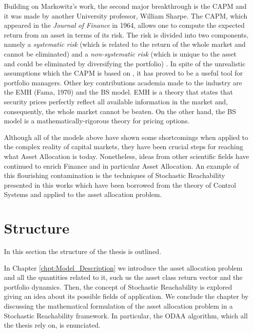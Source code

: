 Building on Markowitz's work, the second major breakthrough is the \gls{CAPM} and it was made by another University professor, William Sharpe. The \gls{CAPM}, which appeared in the \textit{Journal of Finance} in 1964, allows one to compute the expected return from an asset in terms of its risk. The risk is divided into two components, namely a \textit{systematic risk} (which is related to the return of the whole market and cannot be eliminated) and a \textit{non-systematic risk} (which is unique to the asset and could be eliminated by diversifying the portfolio) \cite{hull2014}. In spite of the unrealistic assumptions which the \gls{CAPM} is based on \cite{hull2015risk},  it has proved to be a useful tool for portfolio managers. Other key contributions academia made to the industry are the \gls{EMH} (Fama, 1970) and the \gls{BS} model. \gls{EMH} is a theory that states that security prices perfectly reflect all available information in the market and, consequently, the whole market cannot be beaten. On the other hand, the \gls{BS} model is a mathematically-rigorous theory for pricing options.

Although all of the models above have shown some shortcomings when applied to the complex reality of capital markets, they have been crucial steps for reaching what Asset Allocation is today. Nonetheless, ideas from other scientific fields have continued to  enrich Finance and in particular Asset Allocation. An example of this flourishing contamination is the techniques of Stochastic Reachability presented in this works which have been borrowed from the theory of Control Systems and applied to the asset allocation problem.



\section{Structure}
In this section the structure of the thesis is outlined.

In Chapter \ref{chpt:Model_Description} we introduce the asset allocation problem and all the quantities related to it, such us the asset class return vector and the portfolio dynamics. Then, the concept of Stochastic Reachability is explored giving an idea about its possible fields of application. We conclude the chapter by discussing the mathematical formulation of the asset allocation problem in a Stochastic Reachability framework. In particular, the \gls{ODAA} algorithm, which all the thesis rely on, is enunciated.

